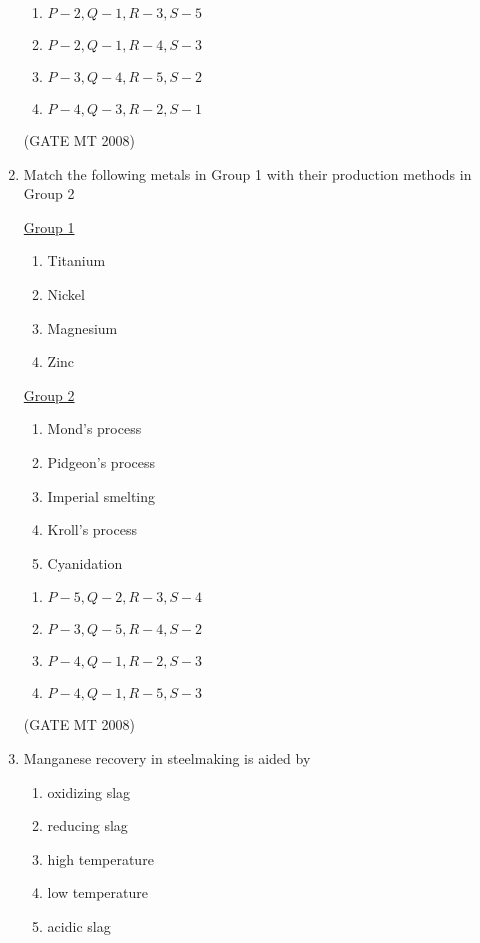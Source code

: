 \documentclass[journal, 11pt, onecolumn]{IEEEtran}
\theoremstyle{remark}
\begin{document}
\begin{enumerate}
\begin{multicols}{2}
\begin{enumerate}
\item $P-2, Q-1, R-3, S-5$
\item $P-2, Q-1, R-4, S-3$
\item $P-3, Q-4, R-5, S-2$
\item $P-4, Q-3, R-2, S-1$
\end{enumerate}
\end{multicols}

\hfill(GATE MT 2008)

\item Match the following metals in Group 1 with their production methods in Group 2
\begin{multicols}{2}
\underline{Group 1}
\begin{enumerate}[label=(\Alph*), start=16]
\item Titanium
\item Nickel
\item Magnesium
\item Zinc
\end{enumerate}

\underline{Group 2}
\begin{enumerate}[label=(\arabic*), start=1]
\item Mond's process
\item Pidgeon's process
\item Imperial smelting
\item Kroll's process
\item Cyanidation
\end{enumerate}
\end{multicols}

\begin{multicols}{2}
\begin{enumerate}
\item $P-5, Q-2, R-3, S-4$
\item $P-3, Q-5, R-4, S-2$
\item $P-4, Q-1, R-2, S-3$
\item $P-4, Q-1, R-5, S-3$
\end{enumerate}
\end{multicols}

\hfill(GATE MT 2008)

\item Manganese recovery in steelmaking is aided by
\begin{enumerate}[label=(\MakeUppercase{\alph*}), start=16]
\item oxidizing slag
\item reducing slag
\item high temperature
\item low temperature
\item acidic slag 
\end{enumerate}


\end{enumerate}
\end{document}

